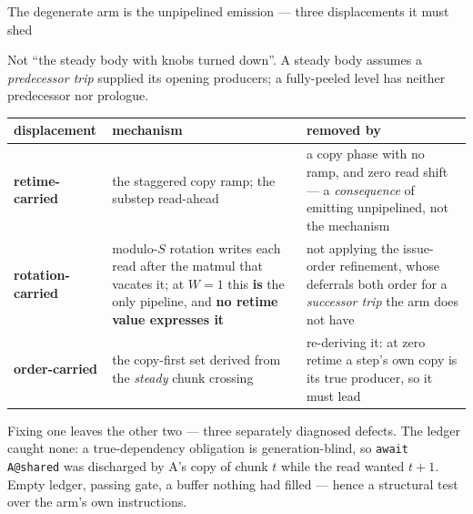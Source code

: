 \documentclass[aspectratio=169,9pt]{beamer}
\newcommand{\tsub}[1]{{\footnotesize\color{gray}#1}}
\newcommand{\key}[1]{\textcolor{acc}{\textbf{#1}}}
\newcommand{\bad}[1]{\textcolor{warn}{\textbf{#1}}}
\begin{document}
\begin{frame}{The degenerate arm is the unpipelined emission --- three displacements it must shed}

Not ``the steady body with knobs turned down''. A steady body assumes a \emph{predecessor trip}
supplied its opening producers; a fully-peeled level has neither predecessor nor prologue.

\begin{center}
\end{center}

\begin{center}\scriptsize
\begin{tabular}{p{20mm}p{38mm}p{40mm}}
\toprule
displacement & mechanism & removed by \\
\midrule
\key{retime-carried} & the staggered copy ramp; the substep read-ahead & a copy phase with no ramp, and zero read shift --- a \emph{consequence} of emitting unpipelined, not the mechanism \\
\key{rotation-carried} & modulo-$S$ rotation writes each read after the matmul that vacates it; at $W{=}1$ this \bad{is} the only pipeline, and \bad{no retime value expresses it} & not applying the issue-order refinement, whose deferrals both order for a \emph{successor trip} the arm does not have \\
\key{order-carried} & the copy-first set derived from the \emph{steady} chunk crossing & re-deriving it: at zero retime a step's own copy is its true producer, so it must lead \\
\bottomrule
\end{tabular}
\end{center}

\tsub{Fixing one leaves the other two --- three separately diagnosed defects. The ledger caught none: a true-dependency obligation is generation-blind, so \texttt{await A@shared} was discharged by A's copy of chunk $t$ while the read wanted $t{+}1$. Empty ledger, passing gate, a buffer nothing had filled --- hence a structural test over the arm's own instructions.}
\end{frame}
\end{document}
